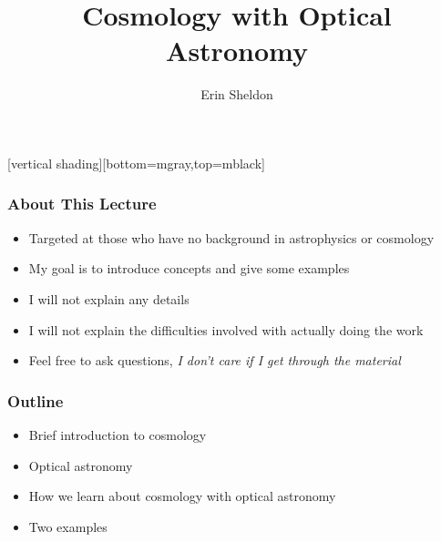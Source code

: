 \documentclass{beamer}
\title{Cosmology with Optical Astronomy}
\author{Erin Sheldon}
\institute{Brookhaven National Laboratory}
\begin{document}
\frame
{
}
[vertical shading][bottom=mgray,top=mblack]



\frame{\titlepage}



\frame
{
    \frametitle{About This Lecture}


    \begin{itemize}

        \item Targeted at those who have no background
            in astrophysics or cosmology

        \item My goal is to introduce concepts and give some examples

        \item I will not explain any details

        \item I will not explain the difficulties involved with actually
            doing the work

        \item Feel free to ask questions, {\em I don't care if I get through the
            material}

    \end{itemize}

}



\frame
{
    \frametitle{Outline}


    \begin{itemize}

        \item Brief introduction to cosmology
        \item Optical astronomy
        \item How we learn about cosmology with optical astronomy
        \item Two examples

    \end{itemize}

}
\end{document}
